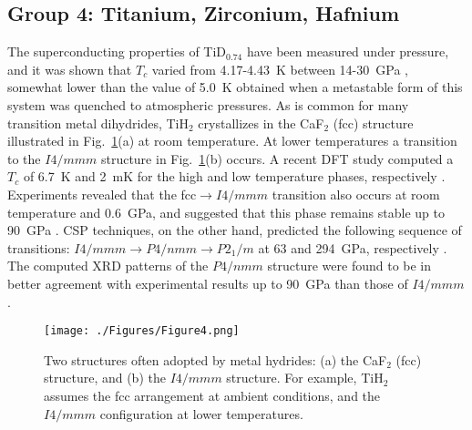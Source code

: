 \documentclass[12pt,letterpaper,oneside]{article}
\begin{document}
\subsection{Group 4: Titanium, Zirconium, Hafnium}
%
The superconducting properties of TiD$_{0.74}$ have been measured under pressure, and it was shown that $T_c$ varied from 4.17-4.43~K between 14-30~GPa \cite{Bashkin:1998a}, somewhat lower than the value of 5.0~K obtained when a metastable form of this system was quenched to atmospheric pressures. 
As is common for many transition metal dihydrides, TiH$_2$ crystallizes in the CaF$_{2}$ (fcc) structure illustrated in Fig.\ \ref{fig:group4}(a) at room temperature. At lower temperatures a transition to the $I4/mmm$ structure in Fig.\ \ref{fig:group4}(b) occurs. A recent DFT study computed a $T_c$ of 6.7~K and 2~mK for the high and low temperature phases, respectively \cite{Shanavas:2016a}. Experiments revealed that the fcc$\rightarrow I4/mmm$ transition also occurs at room temperature and 0.6~GPa, and suggested that this phase remains stable up to 90~GPa \cite{Kalita:2010}. CSP techniques, on the other hand, predicted the following sequence of transitions:  $I4/mmm \rightarrow P4/nmm \rightarrow P2_1/m$ at 63 and 294~GPa, respectively \cite{Gao:2013}. The computed XRD patterns of the $P4/nmm$ structure were found to be in better agreement with experimental results up to 90~GPa than those of $I4/mmm$.
%
\begin{figure}[h!]
\begin{center}
\texttt{[image: ./Figures/Figure4.png]}
\end{center}
\caption{Two structures often adopted by metal hydrides: (a) the CaF$_2$ (fcc) structure, and (b) the $I4/mmm$ structure. For example, TiH$_2$ assumes the fcc arrangement at ambient conditions, and the $I4/mmm$ configuration at lower temperatures.}
\label{fig:group4}
\end{figure}
\end{document}
